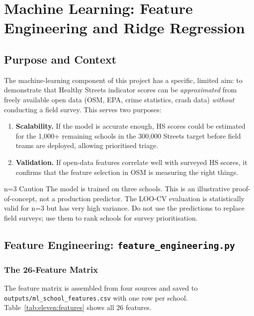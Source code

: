 \documentclass[11pt,a4paper,openany]{book}
\begin{document}
\chapter{Machine Learning: Feature Engineering and Ridge Regression}

\section{Purpose and Context}

The machine-learning component of this project has a specific, limited aim: to demonstrate that Healthy Streets indicator scores can be \emph{approximated} from freely available open data (OSM, EPA, crime statistics, crash data) \emph{without} conducting a field survey. This serves two purposes:

\begin{enumerate}
  \item \textbf{Scalability.} If the model is accurate enough, HS scores could be estimated for the 1,000+ remaining schools in the 300,000 Streets target before field teams are deployed, allowing prioritised triage.
  \item \textbf{Validation.} If open-data features correlate well with surveyed HS scores, it confirms that the feature selection in OSM is measuring the right things.
\end{enumerate}

\begin{warnbox}{n=3 Caution}
The model is trained on three schools. This is an illustrative proof-of-concept, not a production predictor. The LOO-CV evaluation is statistically valid for n=3 but has very high variance. Do not use the predictions to replace field surveys; use them to rank schools for survey prioritisation.
\end{warnbox}

\section{Feature Engineering: \texttt{feature\_engineering.py}}

\subsection{The 26-Feature Matrix}

The feature matrix is assembled from four sources and saved to \texttt{outputs/ml\_school\_features.csv} with one row per school. Table~\ref{tab:eleven:features} shows all 26 features.
\end{document}
